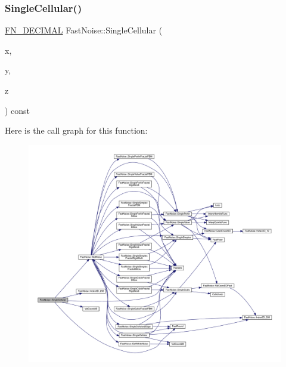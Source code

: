 \subsubsection{\texorpdfstring{Single\+Cellular()}{SingleCellular()}\hspace{0.1cm}{\footnotesize\ttfamily [2/2]}}
{\footnotesize\ttfamily \mbox{\hyperlink{_fast_noise_8h_a75a9ef6d2541c4921815b885bfd449c3}{F\+N\+\_\+\+D\+E\+C\+I\+M\+AL}} Fast\+Noise\+::\+Single\+Cellular (\begin{DoxyParamCaption}\item[{\mbox{\hyperlink{_fast_noise_8h_a75a9ef6d2541c4921815b885bfd449c3}{F\+N\+\_\+\+D\+E\+C\+I\+M\+AL}}}]{x,  }\item[{\mbox{\hyperlink{_fast_noise_8h_a75a9ef6d2541c4921815b885bfd449c3}{F\+N\+\_\+\+D\+E\+C\+I\+M\+AL}}}]{y,  }\item[{\mbox{\hyperlink{_fast_noise_8h_a75a9ef6d2541c4921815b885bfd449c3}{F\+N\+\_\+\+D\+E\+C\+I\+M\+AL}}}]{z }\end{DoxyParamCaption}) const\hspace{0.3cm}{\ttfamily [private]}}

Here is the call graph for this function\+:
\nopagebreak
\begin{figure}[H]
\begin{center}
\leavevmode
\includegraphics[width=350pt]{class_fast_noise_a0d55ad41a81a37df679a5ed92cef2d36_cgraph}
\end{center}
\end{figure}
\mbox{\label{class_fast_noise_a2b9280204ddb0ffe0b8c3c6502cfe05e}} 
